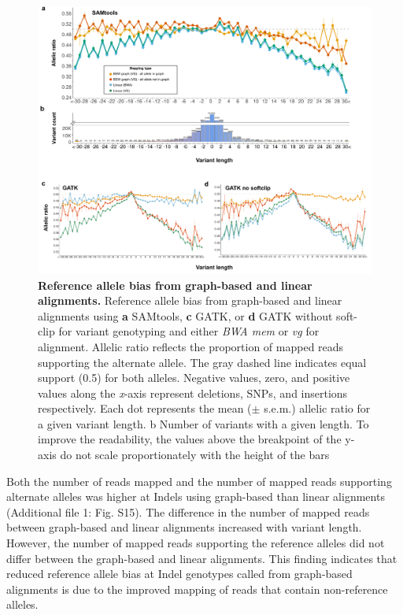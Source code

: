 \documentclass[../main.tex]{subfiles}
\begin{document}
\begin{figure}[!htb]
    \centering
    \includegraphics[width=\textwidth]{paper2/main_figure/Fig7.pdf}
    \caption[Reference allele bias from graphs]{\textbf{Reference allele bias from graph-based and linear alignments.} 
    \small{Reference allele bias from graph-based and linear alignments using \textbf{a} SAMtools, \textbf{c} GATK, or \textbf{d} GATK without soft-clip for variant genotyping and either \emph{BWA mem} or \emph{vg} for alignment. Allelic ratio reflects the proportion of mapped reads supporting the alternate allele. The gray dashed line indicates equal support (0.5) for both alleles. Negative values, zero, and positive values along the \emph{x}-axis represent deletions, SNPs, and insertions respectively. Each dot represents the mean ($\pm$ s.e.m.) allelic ratio for a given variant length. b Number of variants with a given length. To improve the readability, the values above the breakpoint of the y-axis do not scale proportionately with the height of the bars}}
    \label{fig37:bias}
\end{figure}

Both the number of reads mapped and the number of mapped reads supporting alternate alleles was higher at Indels using graph-based than linear alignments (Additional file 1: Fig. S15). The difference in the number of mapped reads between graph-based and linear alignments increased with variant length. However, the number of mapped reads supporting the reference alleles did not differ between the graph-based and linear alignments. This finding indicates that reduced reference allele bias at Indel genotypes called from graph-based alignments is due to the improved mapping of reads that contain non-reference alleles.
\end{document}

